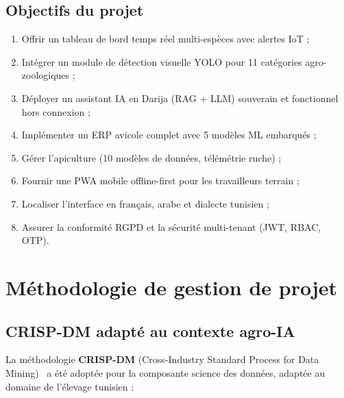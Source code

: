 \subsection{Objectifs du projet}
\begin{enumerate}
  \item Offrir un tableau de bord temps réel multi-espèces avec alertes IoT ;
  \item Intégrer un module de détection visuelle YOLO pour 11 catégories
        agro-zoologiques ;
  \item Déployer un assistant IA en Darija (RAG + LLM) souverain et
        fonctionnel hors connexion ;
  \item Implémenter un ERP avicole complet avec 5 modèles ML embarqués ;
  \item Gérer l'apiculture (10 modèles de données, télémétrie ruche) ;
  \item Fournir une PWA mobile offline-first pour les travailleurs terrain ;
  \item Localiser l'interface en français, arabe et dialecte tunisien ;
  \item Assurer la conformité RGPD et la sécurité multi-tenant (JWT, RBAC, OTP).
\end{enumerate}

\section{Méthodologie de gestion de projet}

\subsection{CRISP-DM adapté au contexte agro-IA}

La méthodologie \textbf{CRISP-DM} (Cross-Industry Standard Process for
Data Mining)~\cite{wirth2000} a été adoptée pour la composante science des
données, adaptée au domaine de l'élevage tunisien :

